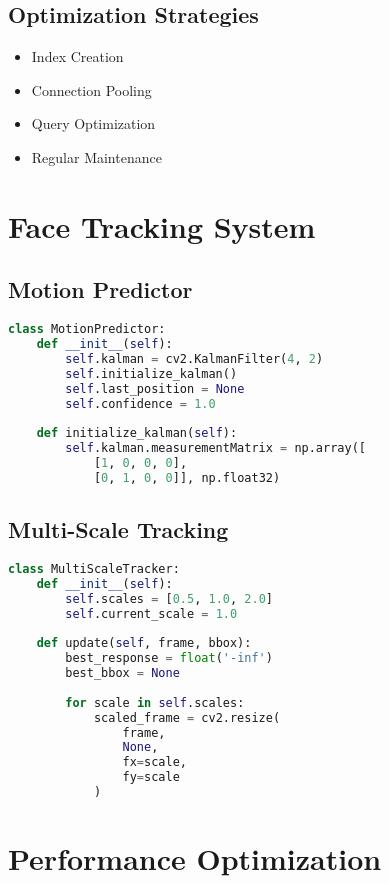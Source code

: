\documentclass[11pt,a4paper]{report}
\begin{document}
\section{Optimization Strategies}
\begin{itemize}
    \item Index Creation
    \item Connection Pooling
    \item Query Optimization
    \item Regular Maintenance
\end{itemize}

\chapter{Face Tracking System}

\section{Motion Predictor}
\begin{lstlisting}[language=Python]
class MotionPredictor:
    def __init__(self):
        self.kalman = cv2.KalmanFilter(4, 2)
        self.initialize_kalman()
        self.last_position = None
        self.confidence = 1.0
        
    def initialize_kalman(self):
        self.kalman.measurementMatrix = np.array([
            [1, 0, 0, 0],
            [0, 1, 0, 0]], np.float32)
\end{lstlisting}

\section{Multi-Scale Tracking}
\begin{lstlisting}[language=Python]
class MultiScaleTracker:
    def __init__(self):
        self.scales = [0.5, 1.0, 2.0]
        self.current_scale = 1.0
        
    def update(self, frame, bbox):
        best_response = float('-inf')
        best_bbox = None
        
        for scale in self.scales:
            scaled_frame = cv2.resize(
                frame, 
                None, 
                fx=scale, 
                fy=scale
            )
\end{lstlisting}

\chapter{Performance Optimization}
\end{document}

